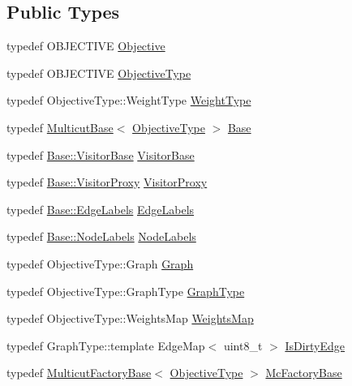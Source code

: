 \subsection*{Public Types}
\begin{DoxyCompactItemize}
\item 
typedef O\+B\+J\+E\+C\+T\+I\+V\+E \hyperlink{classnifty_1_1graph_1_1ChainedSolvers_a963bd16d8459fe660e207c4a57facf5e}{Objective}
\item 
typedef O\+B\+J\+E\+C\+T\+I\+V\+E \hyperlink{classnifty_1_1graph_1_1ChainedSolvers_af640cd977746e90c49366fe7a30e80b1}{Objective\+Type}
\item 
typedef Objective\+Type\+::\+Weight\+Type \hyperlink{classnifty_1_1graph_1_1ChainedSolvers_a274e68cb50882d8b6eb45a100f930efe}{Weight\+Type}
\item 
typedef \hyperlink{classnifty_1_1graph_1_1MulticutBase}{Multicut\+Base}$<$ \hyperlink{classnifty_1_1graph_1_1ChainedSolvers_af640cd977746e90c49366fe7a30e80b1}{Objective\+Type} $>$ \hyperlink{classnifty_1_1graph_1_1ChainedSolvers_af3c13fd5bc8d12ef88678d8191886f1a}{Base}
\item 
typedef \hyperlink{classnifty_1_1graph_1_1MulticutBase_a5882fb69df59d8113f6a81a0dac26eaa}{Base\+::\+Visitor\+Base} \hyperlink{classnifty_1_1graph_1_1ChainedSolvers_a1f90d20ae903cad5e6434d4019b28463}{Visitor\+Base}
\item 
typedef \hyperlink{classnifty_1_1graph_1_1MulticutBase_a6ede271a3cb0ae4711a7e9da2b07efa9}{Base\+::\+Visitor\+Proxy} \hyperlink{classnifty_1_1graph_1_1ChainedSolvers_a2a0d35b426487bc1c84acbac754688e9}{Visitor\+Proxy}
\item 
typedef \hyperlink{classnifty_1_1graph_1_1MulticutBase_aaeefe3c5df81d9c9efffec878cf2fcd7}{Base\+::\+Edge\+Labels} \hyperlink{classnifty_1_1graph_1_1ChainedSolvers_a28c50d486ee20744432cc66e2bab9890}{Edge\+Labels}
\item 
typedef \hyperlink{classnifty_1_1graph_1_1MulticutBase_afba61ad2919d0fad20b3745af19309da}{Base\+::\+Node\+Labels} \hyperlink{classnifty_1_1graph_1_1ChainedSolvers_a68ac6338bbf4e29e0324152d462715de}{Node\+Labels}
\item 
typedef Objective\+Type\+::\+Graph \hyperlink{classnifty_1_1graph_1_1ChainedSolvers_a74491b36d70e81078f265943e85a51ab}{Graph}
\item 
typedef Objective\+Type\+::\+Graph\+Type \hyperlink{classnifty_1_1graph_1_1ChainedSolvers_ab55e77819ad5f20d4c1193ed745b49fe}{Graph\+Type}
\item 
typedef Objective\+Type\+::\+Weights\+Map \hyperlink{classnifty_1_1graph_1_1ChainedSolvers_a34ed66af894d4382882ec3b81260686f}{Weights\+Map}
\item 
typedef Graph\+Type\+::template Edge\+Map$<$ uint8\+\_\+t $>$ \hyperlink{classnifty_1_1graph_1_1ChainedSolvers_a85e87137c3b85a8f4c4a64fba26394c3}{Is\+Dirty\+Edge}
\item 
typedef \hyperlink{classnifty_1_1graph_1_1MulticutFactoryBase}{Multicut\+Factory\+Base}$<$ \hyperlink{classnifty_1_1graph_1_1ChainedSolvers_af640cd977746e90c49366fe7a30e80b1}{Objective\+Type} $>$ \hyperlink{classnifty_1_1graph_1_1ChainedSolvers_a8a106a334a73a0dd278d06af04ef163d}{Mc\+Factory\+Base}
\end{DoxyCompactItemize}
